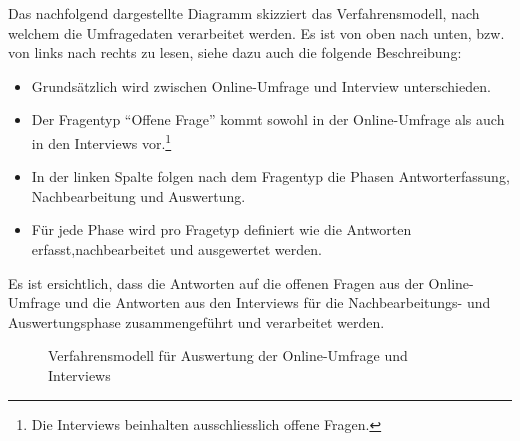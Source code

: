 \documentclass[../../main.tex]{subfiles}
\begin{document}
\begin{sloppypar}
Das nachfolgend dargestellte Diagramm skizziert das Verfahrensmodell, nach welchem die Umfragedaten verarbeitet werden. Es ist von oben nach unten, bzw. von links nach rechts zu lesen, siehe dazu auch die folgende Beschreibung:

\begin{itemize}
  \item Grundsätzlich wird zwischen Online-Umfrage und Interview unterschieden. 
  \item Der Fragentyp "`Offene Frage"' kommt sowohl in der Online-Umfrage \newline als auch in den Interviews vor.\footnote{Die Interviews beinhalten ausschliesslich offene Fragen.}
  \item In der linken Spalte folgen nach dem Fragentyp die Phasen Antworterfassung, \newline Nachbearbeitung und Auswertung. 
  \item Für jede Phase wird pro Fragetyp definiert wie die Antworten erfasst,\newline nachbearbeitet und ausgewertet werden.
\end{itemize}

Es ist ersichtlich, dass die Antworten auf die offenen Fragen aus der Online-Umfrage und die Antworten aus den Interviews für die Nachbearbeitungs- und Auswertungsphase zusammengeführt und verarbeitet werden.
\end{sloppypar}

\begin{figure}[H]
 \centering
    
 \caption{Verfahrensmodell für Auswertung der Online-Umfrage und Interviews}
 \label{Allgemeines Vorgehen}
\end{figure}
\end{document}
